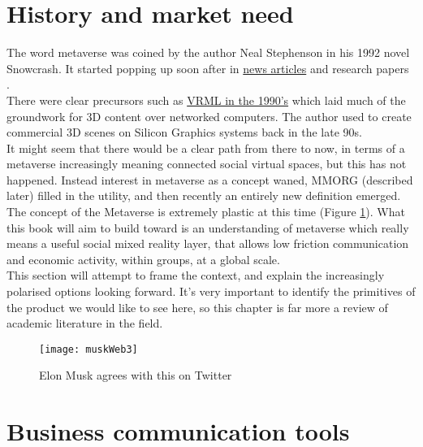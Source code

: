 
\section{History and market need}

The word metaverse was coined by the author Neal Stephenson in his 1992 novel Snowcrash. It started popping up soon after in \href{https://www.newscientist.com/article/mg14819994-000-how-to-build-a-metaverse/}{news articles} and research papers \cite{mclellan1993avatars}.\\
There were clear precursors such as \href{https://www.howtogeek.com/778554/remembering-vrml-the-metaverse-of-1995/}{VRML in the 1990's} which laid much of the groundwork for 3D content over networked computers. The author used to create commercial 3D scenes on Silicon Graphics systems back in the late 90s.\\
It might seem that there would be a clear path from there to now, in terms of a metaverse increasingly meaning connected social virtual spaces, but this has not happened. Instead interest in metaverse as a concept waned, MMORG (described later) filled in the utility, and then recently an entirely new definition emerged. The concept of the Metaverse is extremely plastic at this time (Figure \ref{fig:muskWeb3}). What this book will aim to build toward is an understanding of metaverse which really means a useful social mixed reality layer, that allows low friction communication and economic activity, within groups, at a global scale.\\
This section will attempt to frame the context, and explain the increasingly polarised options looking forward. It's very important to identify the primitives of the product we would like to see here, so this chapter is far more a review of academic literature in the field.\\

\begin{figure}
  \centering
    \texttt{[image: muskWeb3]}
  \caption{Elon Musk agrees with this on Twitter}
  \label{fig:muskWeb3}
\end{figure}

\section{Business communication tools}
